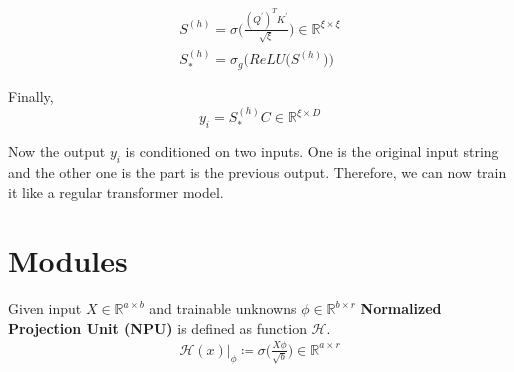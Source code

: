 \documentclass{article}
\begin{document}
\begin{eqnarray}
	S^{(h)} = \sigma\Bigg(\frac{(Q^{\prime})^{T} K^{\prime}}{\sqrt{\xi}}\Bigg) \in \mathbb{R}^{\xi \times \xi} \\
	S^{(h)}_{*} = \sigma_{g}\Big(ReLU\big(S^{(h)}\big)\Big)
\end{eqnarray}

Finally, 
\begin{equation*}
	y_{i} = S_{*}^{(h)} C \in \mathbb{R}^{\xi \times D}
\end{equation*}

Now the output $y_{i}$ is conditioned on two inputs. One is the original input string and the other one is the part is the previous output. Therefore, we can now train it like a regular transformer model. 

\section{Modules}

\begin{tcolorbox}
	Given input $X \in \mathbb{R}^{a\times b}$ and trainable unknowns $\phi \in \mathbb{R}^{b\times r}$ \textbf{Normalized Projection Unit (NPU)} is defined as function $\mathcal{H}$.
	\begin{eqnarray*}
		\mathcal{H}(x)\vert_{\phi} \coloneqq \sigma\Bigg(\frac{X \phi}{\sqrt{b}}\Bigg) \in \mathbb{R}^{a\times r} 
	\end{eqnarray*}
\end{tcolorbox}
\end{document}
